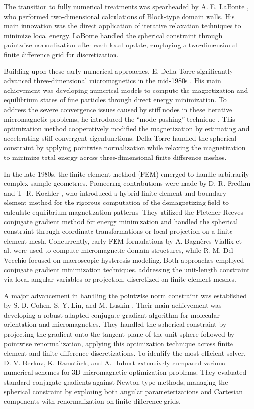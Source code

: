 \documentclass[10pt, a4paper, twocolumn]{article}
\begin{document}
The transition to fully numerical treatments was spearheaded by A. E. LaBonte \cite{LaBonte1969}, who performed two-dimensional calculations of Bloch-type domain walls. His main innovation was the direct application of iterative relaxation techniques to minimize local energy. LaBonte handled the spherical constraint through pointwise normalization after each local update, employing a two-dimensional finite difference grid for discretization.

Building upon these early numerical approaches, E. Della Torre significantly advanced three-dimensional micromagnetics in the mid-1980s \cite{DellaTorre1985, DellaTorre1986}. His main achievement was developing numerical models to compute the magnetization and equilibrium states of fine particles through direct energy minimization. To address the severe convergence issues caused by stiff nodes in these iterative micromagnetic problems, he introduced the ``mode pushing'' technique \cite{TorfehIsfahani1983}. This optimization method cooperatively modified the magnetization by estimating and accelerating stiff convergent eigenfunctions. Della Torre handled the spherical constraint by applying pointwise normalization while relaxing the magnetization to minimize total energy across three-dimensional finite difference meshes.

In the late 1980s, the finite element method (FEM) emerged to handle arbitrarily complex sample geometries. Pioneering contributions were made by D. R. Fredkin and T. R. Koehler \cite{Fredkin1990}, who introduced a hybrid finite element and boundary element method for the rigorous computation of the demagnetizing field to calculate equilibrium magnetization patterns. They utilized the Fletcher-Reeves conjugate gradient method for energy minimization and handled the spherical constraint through coordinate transformations or local projection on a finite element mesh. Concurrently, early FEM formulations by A. Bagn{\`e}res-Viallix et al. \cite{Viallix1988} were used to compute micromagnetic domain structures, while R. M. Del Vecchio \cite{DelVecchio1993} focused on macroscopic hysteresis modeling. Both approaches employed conjugate gradient minimization techniques, addressing the unit-length constraint via local angular variables or projection, discretized on finite element meshes.

A major advancement in handling the pointwise norm constraint was established by S. D. Cohen, S. Y. Lin, and M. Luskin \cite{Cohen1989}. Their main achievement was developing a robust adapted conjugate gradient algorithm for molecular orientation and micromagnetics. They handled the spherical constraint by projecting the gradient onto the tangent plane of the unit sphere followed by pointwise renormalization, applying this optimization technique across finite element and finite difference discretizations. To identify the most efficient solver, D. V. Berkov, K. Ramst{\"o}ck, and A. Hubert \cite{Hubert1993} extensively compared various numerical schemes for 3D micromagnetic optimization problems. They evaluated standard conjugate gradients against Newton-type methods, managing the spherical constraint by exploring both angular parameterizations and Cartesian components with renormalization on finite difference grids. 
\end{document}
